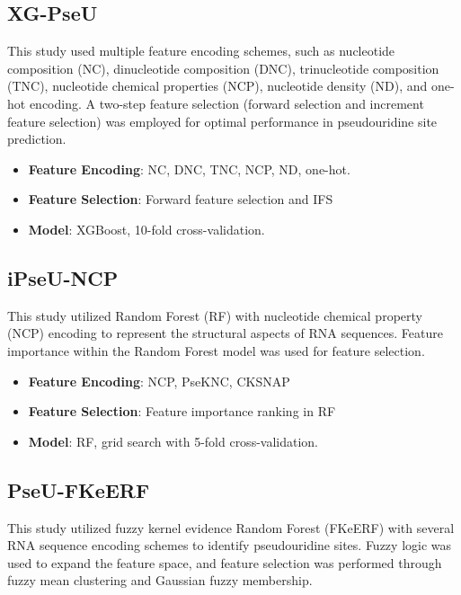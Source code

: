     \subsection*{XG-PseU \cite{liu_xg-pseu_2020}}\label{subsec:XG-PseU}
      This study used multiple feature encoding schemes, such as nucleotide composition (NC), dinucleotide composition (DNC), trinucleotide composition (TNC), nucleotide chemical properties (NCP), nucleotide density (ND), and one-hot encoding.
      A two-step feature selection (forward selection and increment feature selection) was employed for optimal performance in pseudouridine site prediction.

      \begin{itemize}
        \item \textbf{Feature Encoding}: NC, DNC, TNC, NCP, ND, one-hot.
        \item \textbf{Feature Selection}: Forward feature selection and IFS
        \item \textbf{Model}: XGBoost, 10-fold cross-validation.
      \end{itemize}

    \subsection*{iPseU-NCP \cite{nguyen-vo_ipseu-ncp_2019}}\label{subsec:ipseu_ncp}
      This study utilized Random Forest (RF) with nucleotide chemical property (NCP) encoding to represent the structural aspects of RNA sequences.
      Feature importance within the Random Forest model was used for feature selection.

      \begin{itemize}
        \item \textbf{Feature Encoding}: NCP, PseKNC, CKSNAP
        \item \textbf{Feature Selection}: Feature importance ranking in RF
        \item \textbf{Model}: RF, grid search with 5-fold cross-validation.
      \end{itemize}

    \subsection*{PseU-FKeERF \cite{chen_fuzzy_2024}}\label{subsec:PseU-FKeERF}
      This study utilized fuzzy kernel evidence Random Forest (FKeERF) with several RNA sequence encoding schemes to identify pseudouridine sites.
      Fuzzy logic was used to expand the feature space, and feature selection was performed through fuzzy mean clustering and Gaussian fuzzy membership.

